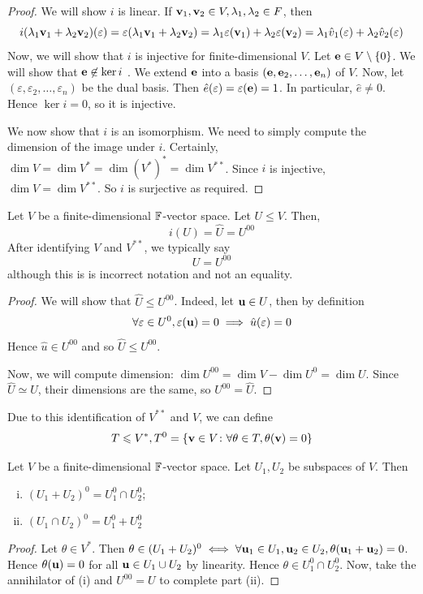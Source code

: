 \documentclass[a4paper]{article}
\begin{document}
\begin{proof}
	We will show $ i $ is linear.
	If $ {\bf v}_1, {\bf v}_2 \in V, \lambda_1, \lambda_2 \in F $, then
	\[
		i(\lambda_1 {\bf v}_1 + \lambda_2 {\bf v}_2) (\varepsilon) = \varepsilon(\lambda_1 {\bf v}_1 + \lambda_2 {\bf v}_2) = \lambda_1 \varepsilon({\bf v}_1) + \lambda_2 \varepsilon({\bf v}_2) = \lambda_1 \hat v_1(\varepsilon) + \lambda_2 \hat v_2(\varepsilon)
	\]
	Now, we will show that $ i $ is injective for finite-dimensional $ V $.
	Let $ {\bf e} \in V \setminus \qty{0} $.
	We will show that $ {\bf e} \not\in \ker i $
    .
	We extend $ {\bf e} $ into a basis $ ({\bf e}, {\bf e}_2, \dots, {\bf e}_n) $ of $ V $.
	Now, let $ (\varepsilon, \varepsilon_2, \dots, \varepsilon_n) $ be the dual basis.
	Then $ \hat e(\varepsilon) = \varepsilon({\bf e}) = 1 $.
	In particular, $ \hat e \neq 0 $.
	Hence $ \ker i = \qty{0} $, so it is injective.

	We now show that $ i $ is an isomorphism.
	We need to simply compute the dimension of the image under $ i $.
	Certainly, $ \dim V = \dim V^* = \dim (V^*)^* = \dim V^{* *} $.
	Since $ i $ is injective, $ \dim V = \dim V^{* *} $.
	So $ i $ is surjective as required.
\end{proof}
\begin{lemma}
	Let $ V $ be a finite-dimensional $ {\mathbb{F}} $-vector space.
	Let $ U \leq V $.
	Then,
	\[
		i(U)=\hat U = U^{00}
	\]
	After identifying $ V $ and $ V^{* *} $, we typically say
	\[
		U = U^{00}
	\]
	although this is is incorrect notation and not an equality.
\end{lemma}
\begin{proof}
	We will show that $ \hat U \leq U^{00} $.
	Indeed, let $ {\bf u} \in U $, then by definition
	\[
		\forall \varepsilon \in U^0, \varepsilon({\bf u}) = 0 \implies \hat u(\varepsilon) = 0
	\]
	Hence $ \hat u \in U^{00} $ and so $ \hat U \leq U^{00} $.

	Now, we will compute dimension:	$ \dim U^{00} = \dim V - \dim U^0 = \dim U $.
	Since $ \hat U \simeq U $, their dimensions are the same, so $ U^{00} = \hat U $.
\end{proof}
\begin{remark}
	Due to this identification of $ V^{* *} $ and $ V $, we can define
	\[
		T \leqslant V^*, T^0 = \qty{{\bf v}\in V \colon \forall \theta \in T, \theta({\bf v}) = 0}
	\]
\end{remark}
\begin{lemma}
	Let $ V $ be a finite-dimensional $ {\mathbb{F}} $-vector space.
	Let $ U_1, U_2 $ be subspaces of $ V $.
	Then
	\begin{enumerate}[(i)]
		\item $ (U_1 + U_2)^0 = U_1^0 \cap U_2^0 $;
		\item $ (U_1 \cap U_2)^0 = U_1^0 + U_2^0 $
	\end{enumerate}
\end{lemma}
\begin{proof}
	Let $ \theta \in V^* $.
	Then $ \theta \in (U_1 + U_2)^0 \iff \forall {\bf u}_1 \in U_1, {\bf u}_2 \in U_2, \theta({\bf u}_1 + {\bf u}_2) = 0 $.
	Hence $ \theta({\bf u}) = 0 $ for all $ {\bf u} \in U_1 \cup U_2 $ by linearity.
	Hence $ \theta \in U_1^0 \cap U_2^0 $.
	Now, take the annihilator of (i) and $ U^{00} = U $ to complete part (ii).
\end{proof}
\end{document}
